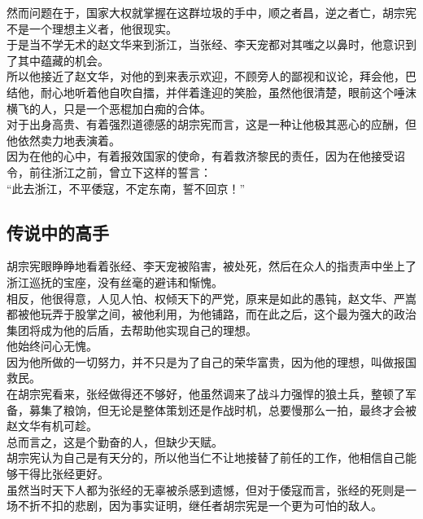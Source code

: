 \begin{multicols}{\theparacolNo}
然而问题在于，国家大权就掌握在这群垃圾的手中，顺之者昌，逆之者亡，胡宗宪不是一个理想主义者，他很现实。\\

于是当不学无术的赵文华来到浙江，当张经、李天宠都对其嗤之以鼻时，他意识到了其中蕴藏的机会。\\

所以他接近了赵文华，对他的到来表示欢迎，不顾旁人的鄙视和议论，拜会他，巴结他，耐心地听着他自吹自擂，并伴着逢迎的笑脸，虽然他很清楚，眼前这个唾沫横飞的人，只是一个恶棍加白痴的合体。\\

对于出身高贵、有着强烈道德感的胡宗宪而言，这是一种让他极其恶心的应酬，但他依然卖力地表演着。\\

因为在他的心中，有着报效国家的使命，有着救济黎民的责任，因为在他接受诏令，前往浙江之前，曾立下这样的誓言：\\

“此去浙江，不平倭寇，不定东南，誓不回京！”\\

\subsection{传说中的高手}
胡宗宪眼睁睁地看着张经、李天宠被陷害，被处死，然后在众人的指责声中坐上了浙江巡抚的宝座，没有丝毫的避讳和惭愧。\\

相反，他很得意，人见人怕、权倾天下的严党，原来是如此的愚钝，赵文华、严嵩都被他玩弄于股掌之间，被他利用，为他铺路，而在此之后，这个最为强大的政治集团将成为他的后盾，去帮助他实现自己的理想。\\

他始终问心无愧。\\

因为他所做的一切努力，并不只是为了自己的荣华富贵，因为他的理想，叫做报国救民。\\

在胡宗宪看来，张经做得还不够好，他虽然调来了战斗力强悍的狼土兵，整顿了军备，募集了粮饷，但无论是整体策划还是作战时机，总要慢那么一拍，最终才会被赵文华有机可趁。\\

总而言之，这是个勤奋的人，但缺少天赋。\\

胡宗宪认为自己是有天分的，所以他当仁不让地接替了前任的工作，他相信自己能够干得比张经更好。\\

虽然当时天下人都为张经的无辜被杀感到遗憾，但对于倭寇而言，张经的死则是一场不折不扣的悲剧，因为事实证明，继任者胡宗宪是一个更为可怕的敌人。\\


\end{multicols}
